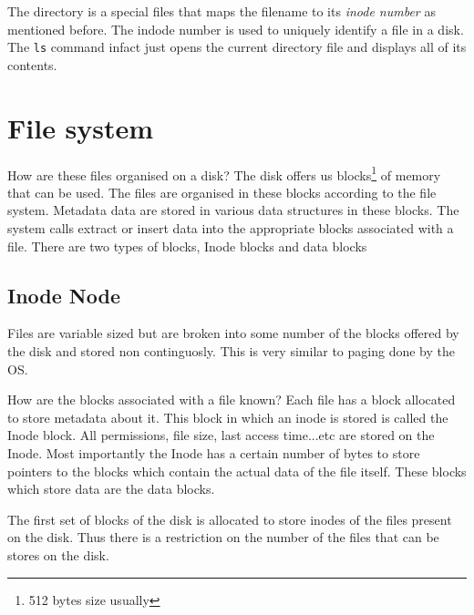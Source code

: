 \documentclass[12pt]{article}
\begin{document}
The directory is a special files that maps the filename to its \textit{inode number} as mentioned before. The indode number is used to uniquely identify a file in a disk. The \texttt{ls} command infact just opens the current directory file and displays all of its contents.

\section{File system}

How are these files organised on a disk?
The disk offers us blocks\footnote{512 bytes size usually} of memory that can be used. The files are organised in these blocks according to the file system. Metadata data are stored in various data structures in these blocks. The system calls extract or insert data into the appropriate blocks associated with a file.
There are two types of blocks, Inode blocks and data blocks
\subsection{Inode Node}
Files are variable sized but are broken into some number of the blocks offered by the disk and stored non continguosly. This is very similar to paging done by the OS. 


How are the blocks associated with a file known? Each file has a block allocated to store metadata about it. This block in which an inode is stored is called the Inode block. All permissions, file size, last access time...etc are stored on the Inode. Most importantly the 
Inode has a certain number of bytes to store pointers to the blocks which contain the actual data of the file itself. These blocks which store data are the data blocks. 


The first set of blocks of the disk is allocated to store inodes of the files present on the disk. Thus there is a restriction on the number of the files that can be stores on the disk.
\end{document}
